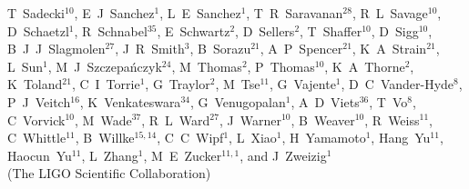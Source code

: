 \documentclass[12pt]{iopart}
\begin{document}
{T~Sadecki$^{10}$,  %
E~J~Sanchez$^{1}$,  %
L~E~Sanchez$^{1}$,  %
T~R~Saravanan$^{28}$, %
R~L~Savage$^{10}$,  %
D~Schaetzl$^{1}$,  %
R~Schnabel$^{35}$,  %
E~Schwartz$^{2}$,  %
D~Sellers$^{2}$,  %
T~Shaffer$^{10}$,  %
D~Sigg$^{10}$,  %
B~J~J~Slagmolen$^{27}$,  %
J~R~Smith$^{3}$,  %
B~Sorazu$^{21}$,  %
A~P~Spencer$^{21}$,  %
K~A~Strain$^{21}$,  %
L~Sun$^{1}$,  %
M~J~Szczepa\'nczyk$^{24}$,  %
M~Thomas$^{2}$,  %
P~Thomas$^{10}$,  %
K~A~Thorne$^{2}$,  %
K~Toland$^{21}$,  %
C~I~Torrie$^{1}$,  %
G~Traylor$^{2}$,  %
M~Tse$^{11}$,  %
G~Vajente$^{1}$,  %
D~C~Vander-Hyde$^{8}$,  %
P~J~Veitch$^{16}$,  %
K~Venkateswara$^{34}$,  %
G~Venugopalan$^{1}$,  %
A~D~Viets$^{36}$,  %
T~Vo$^{8}$,  %
C~Vorvick$^{10}$,  %
M~Wade$^{37}$,  %
R~L~Ward$^{27}$,  %
J~Warner$^{10}$,  %
B~Weaver$^{10}$,  %
R~Weiss$^{11}$,  %
C~Whittle$^{11}$,  %
B~Willke$^{15,14}$,  %
C~C~Wipf$^{1}$,  %
L~Xiao$^{1}$,  %
H~Yamamoto$^{1}$,  %
Hang~Yu$^{11}$,  %
Haocun~Yu$^{11}$,  %
L~Zhang$^{1}$,  %
M~E~Zucker$^{11,1}$,  %
and
J~Zweizig$^{1}$%
\\
{(The LIGO Scientific Collaboration)}%
}%
\par\medskip
\address {$^{1}$LIGO, California Institute of Technology, Pasadena, CA 91125, USA }
\address {$^{2}$LIGO Livingston Observatory, Livingston, LA 70754, USA }
\address {$^{3}$California State University Fullerton, Fullerton, CA 92831, USA }
\address {$^{4}$Columbia University, New York, NY 10027, USA }
\address {$^{5}$Louisiana State University, Baton Rouge, LA 70803, USA }
\address {$^{6}$Christopher Newport University, Newport News, VA 23606, USA }
\address {$^{7}$University of Oregon, Eugene, OR 97403, USA }
\address {$^{8}$Syracuse University, Syracuse, NY 13244, USA }
\address {$^{9}$University of Minnesota, Minneapolis, MN 55455, USA }
\address {$^{10}$LIGO Hanford Observatory, Richland, WA 99352, USA }
\address {$^{11}$LIGO, Massachusetts Institute of Technology, Cambridge, MA 02139, USA }
\address {$^{12}$Stanford University, Stanford, CA 94305, USA }
\end{document}
